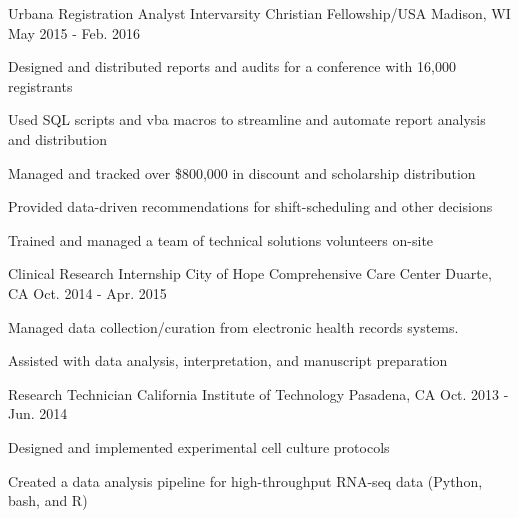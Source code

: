 \begin{cventries}
  \cventry
    {Urbana Registration Analyst} %
    {Intervarsity Christian Fellowship/USA} %
    {Madison, WI} %
    {May 2015 - Feb. 2016} %
    {
      \begin{cvitems} %
        \item {Designed and distributed reports and audits for a conference with 16,000 registrants}
        \item {Used SQL scripts and vba macros to streamline and automate report analysis and distribution}
        \item {Managed and tracked over \$800,000 in discount and scholarship distribution}
        \item {Provided data-driven recommendations for shift-scheduling and other decisions}
        \item {Trained and managed a team of technical solutions volunteers on-site}
      \end{cvitems}
    }

  \cventry
    {Clinical Research Internship} %
    {City of Hope Comprehensive Care Center} %
    {Duarte, CA} %
    {Oct. 2014 - Apr. 2015} %
    {
      \begin{cvitems} %
        \item {Managed data collection/curation from electronic health records systems.}
        \item {Assisted with data analysis, interpretation, and manuscript preparation}
      \end{cvitems}
    }

  \cventry
    {Research Technician} %
    {California Institute of Technology} %
    {Pasadena, CA} %
    {Oct. 2013 - Jun. 2014} %
    {
      \begin{cvitems} %
        \item {Designed and implemented experimental cell culture protocols}
        \item {Created a data analysis pipeline for high-throughput RNA-seq data (Python, bash, and R)}
      \end{cvitems}
    }
    
\end{cventries}

